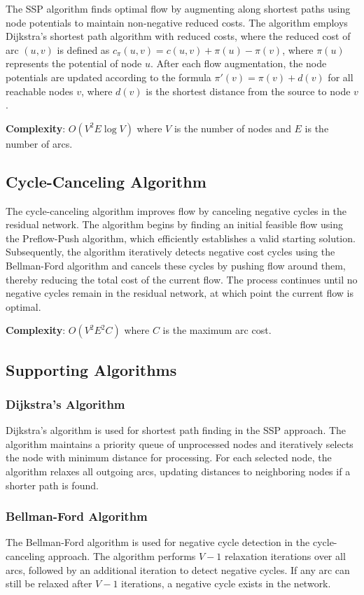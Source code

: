 \documentclass[12pt,a4paper]{article}
\begin{document}
The SSP algorithm finds optimal flow by augmenting along shortest paths using node potentials to maintain non-negative reduced costs. The algorithm employs Dijkstra's shortest path algorithm with reduced costs, where the reduced cost of arc $(u,v)$ is defined as $c_{\pi}(u,v) = c(u,v) + \pi(u) - \pi(v)$, where $\pi(u)$ represents the potential of node $u$. After each flow augmentation, the node potentials are updated according to the formula $\pi'(v) = \pi(v) + d(v)$ for all reachable nodes $v$, where $d(v)$ is the shortest distance from the source to node $v$.

\textbf{Complexity}: $O(V^2E \log V)$ where $V$ is the number of nodes and $E$ is the number of arcs.

\subsection{Cycle-Canceling Algorithm}

The cycle-canceling algorithm improves flow by canceling negative cycles in the residual network. The algorithm begins by finding an initial feasible flow using the Preflow-Push algorithm, which efficiently establishes a valid starting solution. Subsequently, the algorithm iteratively detects negative cost cycles using the Bellman-Ford algorithm and cancels these cycles by pushing flow around them, thereby reducing the total cost of the current flow. The process continues until no negative cycles remain in the residual network, at which point the current flow is optimal.

\textbf{Complexity}: $O(V^2E^2C)$ where $C$ is the maximum arc cost.

\subsection{Supporting Algorithms}

\subsubsection{Dijkstra's Algorithm}
Dijkstra's algorithm is used for shortest path finding in the SSP approach. The algorithm maintains a priority queue of unprocessed nodes and iteratively selects the node with minimum distance for processing. For each selected node, the algorithm relaxes all outgoing arcs, updating distances to neighboring nodes if a shorter path is found.

\subsubsection{Bellman-Ford Algorithm}
The Bellman-Ford algorithm is used for negative cycle detection in the cycle-canceling approach. The algorithm performs $V-1$ relaxation iterations over all arcs, followed by an additional iteration to detect negative cycles. If any arc can still be relaxed after $V-1$ iterations, a negative cycle exists in the network.
\end{document}
